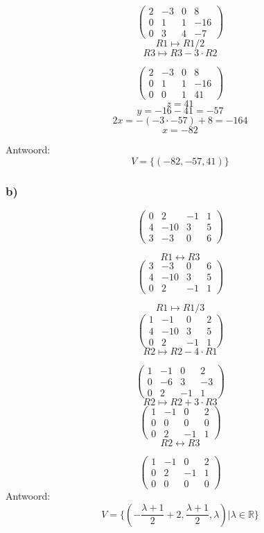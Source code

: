 \documentclass[10pt,a4paper]{article}
\begin{document}
\[
\begin{pmatrix}
2 & -3 & 0 & 8\\
0 & 1 & 1 & -16\\
0 & 3 & 4 & -7
\end{pmatrix}
\]
\[ R1 \longmapsto R1 / 2\]
\[ R3 \longmapsto R3 - 3\cdot R2\]

\[
\begin{pmatrix}
2 & -3 & 0 & 8\\
0 & 1 & 1 & -16\\
0 & 0 & 1 & 41
\end{pmatrix}
\]
\[
z = 41\]
\[y = -16 -41 = -57\]
\[2x = -(-3\cdot -57) + 8=-164\]
\[ x = -82\]

Antwoord:
\[
V = \{(-82,-57,41)\}
\]

\subsubsection*{b)}
\[
\begin{pmatrix}
0 & 2 & -1 & 1\\
4 & -10 & 3 & 5\\
3 & -3 & 0 & 6
\end{pmatrix}
\]

\[ R1 \leftrightarrow R3\]
\[
\begin{pmatrix}
3 & -3 & 0 & 6\\
4 & -10 & 3 & 5\\
0 & 2 & -1 & 1
\end{pmatrix}
\]

\[ R1 \longmapsto R1 / 3\]
\[
\begin{pmatrix}
1 & -1 & 0 & 2\\
4 & -10 & 3 & 5\\
0 & 2 & -1 & 1
\end{pmatrix}
\]
\[ R2 \longmapsto R2 - 4\cdot R1\]

\[
\begin{pmatrix}
1 & -1 & 0 & 2\\
0 & -6 & 3 & -3\\
0 & 2 & -1 & 1
\end{pmatrix}
\]
\[ R2 \longmapsto R2 + 3\cdot R3\]
\[
\begin{pmatrix}
1 & -1 & 0 & 2\\
0 & 0 & 0 & 0\\
0 & 2 & -1 & 1
\end{pmatrix}
\]
\[ R2 \leftrightarrow R3\]

\[
\begin{pmatrix}
1 & -1 & 0 & 2\\
0 & 2 & -1 & 1\\
0 & 0 & 0 & 0
\end{pmatrix}
\]
Antwoord:
\[
V = \{(-\frac{\lambda+1}{2} + 2,\frac{\lambda+1}{2},\lambda) | \lambda \in \mathbb{R}\}
\]
\end{document}

